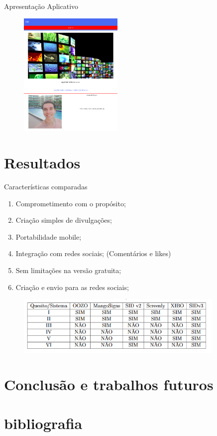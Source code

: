 \documentclass{aula-ifb}
\begin{document}
\begin{frame}{Apresentação Aplicativo}
	\begin{figure}[h]
    	\includegraphics[height=6cm]{figuras/mobile1.png}
	\end{figure}
\end{frame}



\section{Resultados}
\begin{frame}{Características comparadas}
	\begin{enumerate}
		\item Comprometimento com o propósito;
		\item Criação simples de divulgações;
		\item Portabilidade mobile;
		\item Integração com redes sociais; (Comentários e likes)
		\item Sem limitações na versão gratuita;
		\item Criação e envio para as redes sociais;
	\end{enumerate}
	\begin{figure}[h]
		\includegraphics[width=10cm]{figuras/tabela.png}
		\label{fig:figuramobile3}
	\end{figure}
\end{frame}

\section{Conclusão e trabalhos futuros}
\begin{frame}

\end{frame}

\section{bibliografia}
\begin{frame}


\end{frame}
\end{document}
